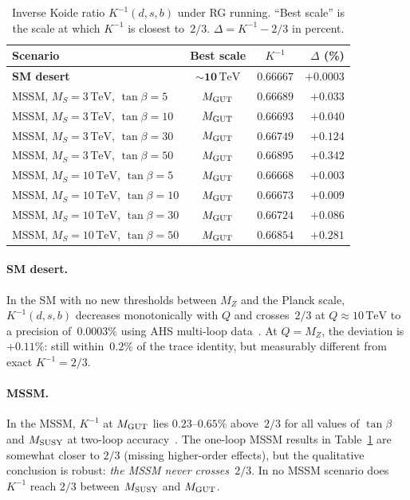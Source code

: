 \documentclass[aps,prd,twocolumn,showpacs,preprintnumbers,superscriptaddress,floatfix]{revtex4-2}
\newcommand{\TeV}{\,\mathrm{TeV}}
\begin{document}
\begin{table}
\centering\small
\caption{Inverse Koide ratio $K^{-1}(d,s,b)$ under RG running.
  ``Best scale'' is the scale at which $K^{-1}$ is closest
  to~$2/3$.  $\Delta = K^{-1} - 2/3$ in percent.}
\label{tab:RG}
\begin{tabular}{lccr}
\toprule
Scenario & Best scale & $K^{-1}$ & $\Delta$ (\%) \\
\midrule
\textbf{SM desert} & $\mathbf{\sim 10\TeV}$ & $\mathbf{0.66667}$
  & $\mathbf{+0.0003}$ \\
MSSM, $M_S = 3\TeV$, $\tan\beta = 5$ & $M_{\rm GUT}$ & $0.66689$ & $+0.033$ \\
MSSM, $M_S = 3\TeV$, $\tan\beta = 10$ & $M_{\rm GUT}$ & $0.66693$ & $+0.040$ \\
MSSM, $M_S = 3\TeV$, $\tan\beta = 30$ & $M_{\rm GUT}$ & $0.66749$ & $+0.124$ \\
MSSM, $M_S = 3\TeV$, $\tan\beta = 50$ & $M_{\rm GUT}$ & $0.66895$ & $+0.342$ \\
MSSM, $M_S = 10\TeV$, $\tan\beta = 5$  & $M_{\rm GUT}$ & $0.66668$ & $+0.003$ \\
MSSM, $M_S = 10\TeV$, $\tan\beta = 10$ & $M_{\rm GUT}$ & $0.66673$ & $+0.009$ \\
MSSM, $M_S = 10\TeV$, $\tan\beta = 30$ & $M_{\rm GUT}$ & $0.66724$ & $+0.086$ \\
MSSM, $M_S = 10\TeV$, $\tan\beta = 50$ & $M_{\rm GUT}$ & $0.66854$ & $+0.281$ \\
\bottomrule
\end{tabular}
\end{table}

\paragraph{SM desert.}
In the SM with no new thresholds between $M_Z$ and the Planck
scale, $K^{-1}(d,s,b)$ decreases monotonically with $Q$ and
crosses~$2/3$ at $Q \approx 10\TeV$ to a precision
of~$0.0003\%$ using AHS multi-loop
data~\cite{AHS:2024,MartinRobertson:2019}.
At $Q = M_Z$, the deviation is $+0.11\%$: still within~$0.2\%$
of the trace identity, but measurably different from exact
$K^{-1} = 2/3$.

\paragraph{MSSM.}
In the MSSM, $K^{-1}$ at $M_{\rm GUT}$ lies $0.23$--$0.65\%$
above~$2/3$ for all values of $\tan\beta$ and $M_{\rm SUSY}$
at two-loop accuracy~\cite{AHS:2024}.
The one-loop MSSM results in Table~\ref{tab:RG} are somewhat
closer to $2/3$ (missing higher-order effects), but the
qualitative conclusion is robust: \emph{the MSSM never
crosses~$2/3$}.
In no MSSM scenario does $K^{-1}$ reach $2/3$ between
$M_{\rm SUSY}$ and $M_{\rm GUT}$.
\end{document}
